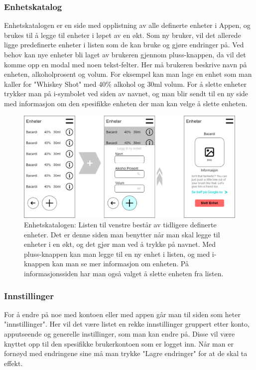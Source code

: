 \documentclass[12pt]{article}
\begin{document}
\subsubsection{Enhetskatalog}
Enhetskatalogen er en side med opplistning av alle definerte enheter i Appen, og brukes til å legge til enheter i løpet av en økt. Som ny bruker, vil det allerede ligge predefinerte enheter i listen som de kan bruke og gjøre endringer på. Ved behov kan nye enheter bli laget av brukeren gjennom pluss-knappen, da vil det komme opp en modal med noen tekst-felter. Her må brukeren beskrive navn på enheten, alkoholprosent og volum. For eksempel kan man lage en enhet som man kaller for "Whiskey Shot" med 40\% alkohol og 30ml volum. For å slette enheter trykker man på i-symbolet ved siden av navnet, og man blir sendt til en ny side med informasjon om den spesifikke enheten der man kan velge å slette enheten.

\begin{figure}[H]
    \centering
    \includegraphics[scale=0.4]{images/lille_promille_unitcatalog.drawio.png}
    \caption{Enhetskatalogen: Listen til venstre består av tidligere definerte enheter. Det er denne siden man benytter når man skal legge til enheter i en økt, og det gjør man ved å trykke på navnet. Med pluss-knappen kan man legge til en ny enhet i listen, og med i-knappen kan man se mer informasjon om enheten. På informasjonssiden har man også valget å slette enheten fra listen.}
\end{figure}

\subsubsection{Innstillinger}
For å endre på noe med kontoen eller med appen går man til siden som heter "innstillinger". Her vil det være listet en rekke innstillinger gruppert etter konto, apputseende og generelle instillinger, som man kan endre på. Disse vil være knyttet opp til den spesifikke brukerkontoen som er logget inn. Når man er fornøyd med endringene sine må man trykke "Lagre endringer" for at de skal ta effekt.
\end{document}
